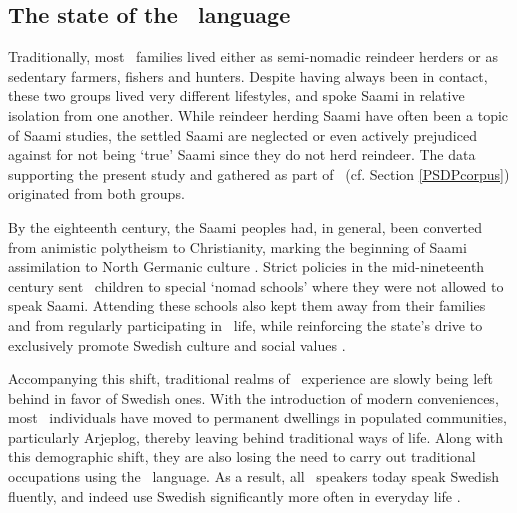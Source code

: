 \FloatBarrier

\subsection{The state of the \PS\ language}\label{sociolinguistics}
Traditionally, most \PS\ families lived either as semi-nomadic reindeer herders or as sedentary farmers, fishers and hunters. Despite having always been in contact, these two groups lived very different lifestyles, and spoke Saami in relative isolation from one another. While reindeer herding Saami have often been a topic of Saami studies, the settled Saami are neglected or even actively prejudiced against for not being ‘true’ Saami since they do not herd reindeer. The data supporting the present study and gathered as part of \PSDP\ (cf. Section \ref{PSDPcorpus}) originated from both groups.

By the eighteenth century, the Saami peoples had, in general, been converted from animistic polytheism to Christianity, marking the beginning of Saami assimilation to North Germanic culture \citep[cf.][]{Pulkkinen2005}. %
Strict policies in the mid-nineteenth century sent \PS\ children to special ‘nomad schools’ where they were not allowed to speak Saami. Attending these schools also kept them away from their families and from regularly participating in \PS\ life, while reinforcing the state’s drive to exclusively promote Swedish culture and social values \citep[cf.][]{ValijarviWilbur2011}. 

Accompanying this shift, traditional realms of \PS\ experience are slowly being left behind in favor of Swedish ones. With the introduction of modern conveniences, most \PS\ individuals have moved to permanent dwellings in populated communities, particularly Arjeplog, thereby leaving behind traditional ways of life. Along with this demographic shift, they are also losing the need to carry out traditional occupations using the \PS\ language. As a result, all \PS\ speakers today speak Swedish fluently, and indeed use Swedish significantly more often in everyday life \citep[cf.][]{ValijarviWilbur2011}.

